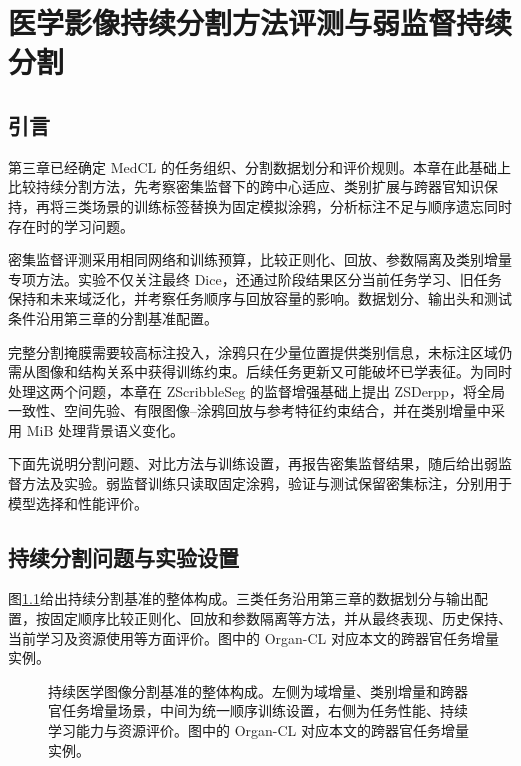 \chapter{医学影像持续分割方法评测与弱监督持续分割}
\label{chap:scribblecl}
\label{chap:segmentation}
\setlength{\emergencystretch}{1em}

\section{引言}
\label{sec:scribblecl-introduction}

第三章已经确定 MedCL 的任务组织、分割数据划分和评价规则。本章在此基础上比较持续分割方法，先考察密集监督下的跨中心适应、类别扩展与跨器官知识保持，再将三类场景的训练标签替换为固定模拟涂鸦，分析标注不足与顺序遗忘同时存在时的学习问题。

密集监督评测采用相同网络和训练预算，比较正则化、回放、参数隔离及类别增量专项方法\cite{wang2026benchmark}。实验不仅关注最终 Dice，还通过阶段结果区分当前任务学习、旧任务保持和未来域泛化，并考察任务顺序与回放容量的影响。数据划分、输出头和测试条件沿用第三章的分割基准配置。

完整分割掩膜需要较高标注投入，涂鸦只在少量位置提供类别信息，未标注区域仍需从图像和结构关系中获得训练约束\cite{tajbakhsh2020imperfect,can2018scribble,zhang2026zscribbleseg}。后续任务更新又可能破坏已学表征。为同时处理这两个问题，本章在 ZScribbleSeg 的监督增强基础上提出 ZSDerpp，将全局一致性、空间先验、有限图像--涂鸦回放与参考特征约束结合，并在类别增量中采用 MiB 处理背景语义变化。

下面先说明分割问题、对比方法与训练设置，再报告密集监督结果，随后给出弱监督方法及实验。弱监督训练只读取固定涂鸦，验证与测试保留密集标注，分别用于模型选择和性能评价。

\section{持续分割问题与实验设置}
\label{sec:benchmark-instance}

图\ref{fig:benchmark-overview}给出持续分割基准的整体构成。三类任务沿用第三章的数据划分与输出配置，按固定顺序比较正则化、回放和参数隔离等方法，并从最终表现、历史保持、当前学习及资源使用等方面评价。图中的 Organ-CL 对应本文的跨器官任务增量实例。

\begin{figure}[htbp]
\centering
{}
\caption[持续医学图像分割基准的整体构成]{持续医学图像分割基准的整体构成。左侧为域增量、类别增量和跨器官任务增量场景，中间为统一顺序训练设置，右侧为任务性能、持续学习能力与资源评价。图中的 Organ-CL 对应本文的跨器官任务增量实例。}
\label{fig:benchmark-overview}
\end{figure}


